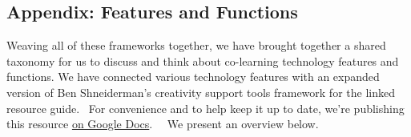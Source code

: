 \subsection{Appendix: Features and Functions}

Weaving all of these frameworks together, we have brought together a
shared taxonomy for us to discuss and think about co-learning technology
features and functions. We have connected various technology features
with an expanded version of Ben Shneiderman's creativity support tools
framework for the linked resource guide.~ For convenience and to help
keep it up to date, we're publishing this resource
\href{http://goo.gl/H02fMA}{on Google Docs}.~~ We present an overview
below.



